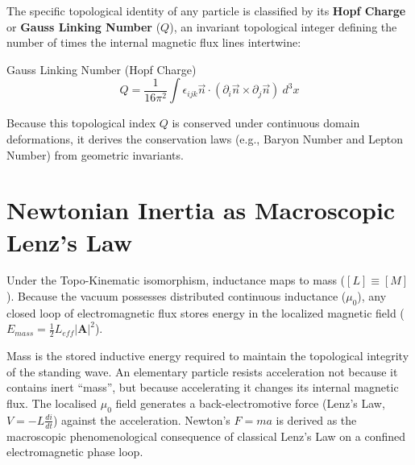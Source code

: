 The specific topological identity of any particle is classified by its \textbf{Hopf Charge} or \textbf{Gauss Linking Number} ($Q$), an invariant topological integer defining the number of times the internal magnetic flux lines intertwine:
\begin{resultbox}{Gauss Linking Number (Hopf Charge)}
\begin{equation}
    Q = \frac{1}{16\pi^2} \int \epsilon_{ijk} \vec{n} \cdot (\partial_i \vec{n} \times \partial_j \vec{n}) \ d^3x
\end{equation}
\end{resultbox}
Because this topological index $Q$ is conserved under continuous domain deformations, it derives the conservation laws (e.g., Baryon Number and Lepton Number) from geometric invariants.

\section{Newtonian Inertia as Macroscopic Lenz's Law}\label{sec:newtonian_inertia_lenz}
Under the Topo-Kinematic isomorphism, inductance maps to mass ($[L] \equiv [M]$). Because the vacuum possesses distributed continuous inductance ($\mu_0$), any closed loop of electromagnetic flux stores energy in the localized magnetic field ($E_{mass} = \frac{1}{2} L_{eff} |\mathbf{A}|^2$).

Mass is the stored inductive energy required to maintain the topological integrity of the standing wave. An elementary particle resists acceleration not because it contains inert ``mass'', but because accelerating it changes its internal magnetic flux. The localised $\mu_0$ field generates a back-electromotive force (Lenz's Law, $V = -L \frac{di}{dt}$) against the acceleration. Newton's $F=ma$ is derived as the macroscopic phenomenological consequence of classical Lenz's Law on a confined electromagnetic phase loop.
